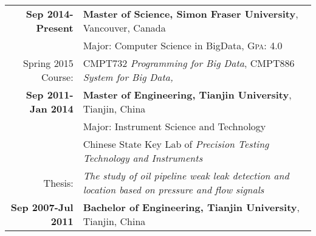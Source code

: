 \documentclass[a4paper,11pt]{article} %
\begin{document}
\begin{tabular}{rl}	
\textbf{Sep 2014-Present} & \textbf{Master of Science, Simon Fraser University}, Vancouver, Canada\\
& Major: Computer Science in BigData, \textsc{Gpa}: 4.0\\
\small{Spring 2015 Course:} & CMPT732 \emph{Programming for Big Data},  CMPT886 \emph{ System for Big Data,} \\




\textbf{Sep 2011-Jan 2014} & \textbf{Master of Engineering, Tianjin University}, Tianjin, China\\
& Major: Instrument Science and Technology\\
& Chinese State Key Lab of \emph{Precision Testing Technology and Instruments}\\
\small{Thesis:} &\emph{The study of oil pipeline weak leak detection and location based on pressure and flow signals}\\




\textbf{Sep 2007-Jul 2011} & \textbf{Bachelor of Engineering, Tianjin University}, Tianjin, China\\



\end{tabular}



\end{document}

